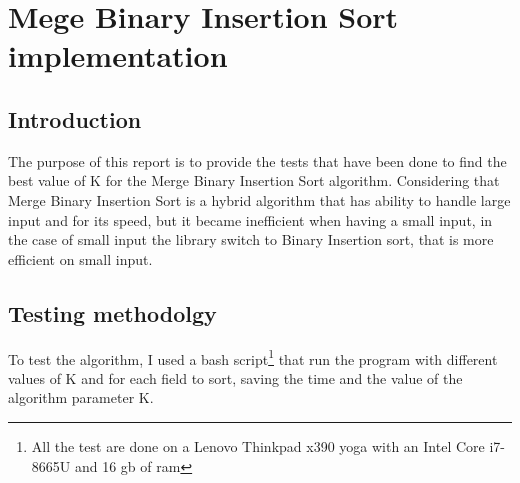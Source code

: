 \section{Mege Binary Insertion Sort implementation}
\subsection{Introduction}
The purpose of this report is to provide the tests that have been done to find the best value of K for the Merge Binary Insertion Sort algorithm.
Considering that Merge Binary Insertion Sort is a hybrid algorithm that has ability to handle large input and for its speed, but it became inefficient when having a small input, in the case of small input the library switch to Binary Insertion sort, that is more efficient on small input.

\subsection{Testing methodolgy}
To test the algorithm, I used a bash script\footnote{All the test are done on a Lenovo Thinkpad x390 yoga with an Intel Core i7-8665U and 16 gb of ram} that run the program with different values of K and for each field to sort, saving the time and the value of the algorithm parameter K.

